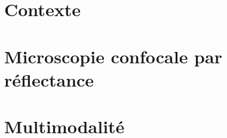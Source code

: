 \documentclass[english,standardlists]{spimubphdthesis}
\begin{document}
\part{Contexte}
\label{part:contexte}



\part{Microscopie confocale par réflectance}
\label{part:microscopie}





\part{Multimodalité}
\label{part:multimodal}





\backmatter





\listoffigures

\listoftables


\printglossary[type=\acronymtype,style=listfracr,title={Liste des acronymes}]

\appendix

\end{document}
